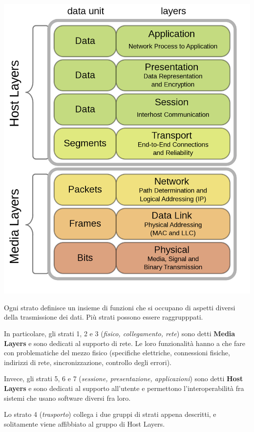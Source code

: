         \begin{center}
            \includegraphics[scale=0.25]{images/OSI.png}
        \end{center}
        
        Ogni strato definisce un insieme di funzioni che si occupano di aspetti diversi della trasmissione dei dati. Più strati possono essere raggrupppati.
        
        In particolare, gli strati 1, 2 e 3 (\textit{fisico, collegamento, rete}) sono detti \textbf{Media Layers} e sono dedicati al supporto di rete. Le loro funzionalità hanno a che fare con problematiche del mezzo fisico (specifiche elettriche, connessioni fisiche, indirizzi di rete, sincronizzazione, controllo degli errori).
        
        Invece, gli strati 5, 6 e 7 (\textit{sessione, presentazione, applicazioni}) sono detti \textbf{Host Layers} e sono dedicati al supporto all'utente e permettono l'interoperabilità fra sistemi che usano software diversi fra loro. 
        
        Lo strato 4 (\textit{trasporto}) collega i due gruppi di strati appena descritti, e solitamente viene affibbiato al gruppo di Host Layers.
        
